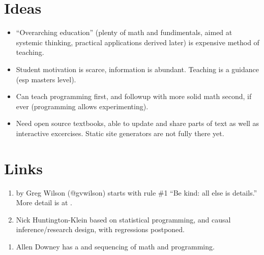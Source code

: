 \documentclass[letterpaper,10pt,english]{sphinxmanual}
\begin{document}
\section{Ideas}
\label{\detokenize{how-to-teach:ideas}}\begin{itemize}
\item {} 
“Overarching education” (plenty of math and fundimentals, aimed at systemic thinking,
practical applications derived later) is expensive method of teaching.

\item {} 
Student motivation is scarce, information is abundant. Teaching is a guidance (esp masters level).

\item {} 
Can teach programming first, and followup with more solid math second, if ever (programming allows experimenting).

\item {} 
Need open source textbooks, able to update and share parts of text as well as
interactive excercises. Static site generators are not fully there yet.

\end{itemize}


\section{Links}
\label{\detokenize{how-to-teach:links}}\begin{enumerate}
%
\item {} 
 by Greg Wilson (@gvwilson) starts with rule \#1 “Be kind: all else is details.” More detail is at .

\item {} 
Nick Huntington-Klein  based on statistical programming, and causal inference/research design, with regressions postponed.

\end{enumerate}

 
\begin{enumerate}
%
\setcounter{enumi}{2}
\item {} 
Allen Downey has a  and sequencing of math and programming.

\end{enumerate}
\end{document}
